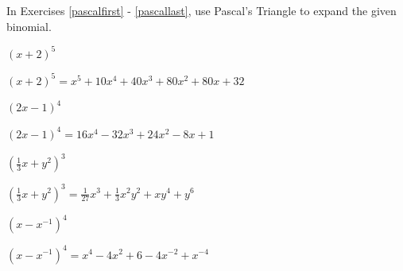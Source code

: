 \documentclass{ximera}
\begin{document}
\begin{question}
    
In Exercises \ref{pascalfirst} - \ref{pascallast}, use Pascal's Triangle to expand the given binomial.

\begin{problem} \label{pascalfirst}
    $(x+2)^5$

    \begin{solution}
         $(x+2)^5 = x^5+10x^4+40x^3+80x^2+80x+32$
    \end{solution}
\end{problem}

\begin{problem}
    $(2x-1)^4$
    
    \begin{solution}
        $(2x-1)^4 = 16x^4-32x^3+24x^2-8x+1$
    \end{solution}
\end{problem}

\begin{problem}
    $\left(\frac{1}{3} x +  y^2\right)^3$
    \begin{solution}
    
        $\left(\frac{1}{3} x +  y^2\right)^3 = \frac{1}{27} x^3+\frac{1}{3}x^2y^2+xy^4+y^6$
    \end{solution}
\end{problem}

\begin{problem}\label{pascallast}
    $\left(x - x^{-1} \right)^{4}$
    \begin{solution}
    
        $\left(x - x^{-1} \right)^{4} = x^4-4x^2+6-4x^{-2}+x^{-4}$
    \end{solution}
\end{problem}

\end{question}
\end{document}
